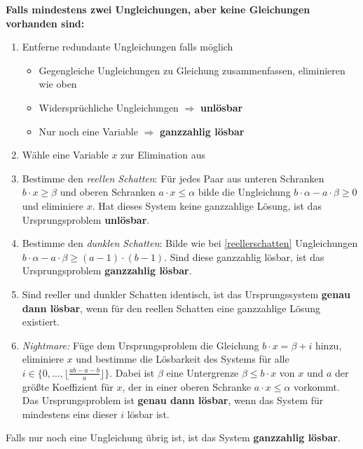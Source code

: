 \documentclass[a4paper,10pt]{article}
\begin{document}
\textbf{Falls mindestens zwei Ungleichungen, aber keine Gleichungen vorhanden sind:}
\vspace*{-0.3em}
\begin{enumerate}
    \item Entferne redundante Ungleichungen falls möglich
        \vspace*{-0.3em}
        \begin{itemize}
            \item Gegengleiche Ungleichungen zu Gleichung zusammenfassen, eliminieren wie oben
            \item Widersprüchliche Ungleichungen $\Rightarrow$ \textbf{unlösbar}
            \item Nur noch eine Variable $\Rightarrow$ \textbf{ganzzahlig lösbar}
        \end{itemize}
    \item Wähle eine Variable $x$ zur Elimination aus
    \item \label{reellerschatten} Bestimme den \textit{reellen Schatten}: Für jedes Paar aus unteren Schranken $b\cdot x\geq\beta$ und oberen Schranken $a\cdot x\leq\alpha$ bilde die Ungleichung $b\cdot \alpha-a\cdot \beta\geq0$ und eliminiere $x$. Hat dieses System keine ganzzahlige Lösung, ist das Ursprungsproblem \textbf{unlösbar}.
    \item Bestimme den \textit{dunklen Schatten}: Bilde wie bei \ref{reellerschatten} Ungleichungen $b\cdot \alpha-a\cdot\beta\geq(a-1)\cdot(b-1)$. Sind diese ganzzahlig lösbar, ist das Ursprungsproblem \textbf{ganzzahlig lösbar}.
    \item Sind reeller und dunkler Schatten identisch, ist das Ursprungssystem \textbf{genau dann lösbar}, wenn für den reellen Schatten eine ganzzahlige Lösung existiert.
    \item \textit{Nightmare:} Füge dem Ursprungsproblem die Gleichung $b\cdot x=\beta+i$ hinzu, eliminiere $x$ und bestimme die Lösbarkeit des Systems für alle $i\in\{0,\hdots,\lfloor\frac{ab-a-b}a\rfloor\}$. Dabei ist $\beta$ eine Untergrenze $\beta\leq b\cdot x$ von $x$ und $a$ der größte Koeffizient für $x$, der in einer oberen Schranke $a\cdot x\leq\alpha$ vorkommt. Das Ursprungsproblem ist \textbf{genau dann lösbar}, wenn das System für mindestens eins dieser $i$ lösbar ist.
\end{enumerate}

Falls nur noch eine Ungleichung übrig ist, ist das System \textbf{ganzzahlig lösbar}.
\end{document}
